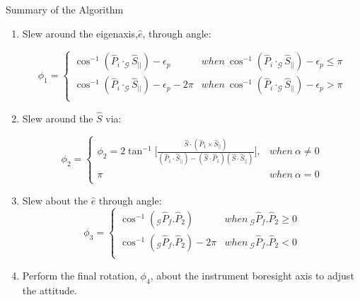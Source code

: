 \documentclass{beamer}
\begin{document}
\begin{frame}{Summary of the Algorithm}
\begin{block}{}
\begin{enumerate}
\item Slew around the eigenaxis,$\hat{e}$, through angle:

 \begin{equation}\label{phi1}
 \phi_1=\left\{
                \begin{array}{ll}
                 \cos^{-1}(\hat{P}_i\cdot_\mathcal{G}\hat{S}_{||})-\epsilon_p& when\  \cos^{-1}(\hat{P}_i\cdot_\mathcal{G}\hat{S}_{||})-\epsilon_p\leq \pi\\
                 \cos^{-1}(\hat{P}_i\cdot_\mathcal{G}\hat{S}_{||})-\epsilon_p-2\pi& when\ \cos^{-1}(\hat{P}_i\cdot_\mathcal{G}\hat{S}_{||})-\epsilon_p>\pi\\
                \end{array}
              \right.
 \end{equation}
\item Slew around the $\hat{S}$ via:

 \begin{equation}\label{phi2}
 \phi_2=\left\{
                \begin{array}{ll}
                \phi_2=2\tan^{-1}\Big[ \frac{\hat{S}\cdot (\hat{P}_1\times\hat{S}_{||})}{(\hat{P}_1\cdot\hat{S}_{||})-(\hat{S}\cdot\hat{P}_1)(\hat{S}\cdot\hat{S}_{||})}\Big],& when\  \alpha\neq 0\\
                 \pi& when\ \alpha=0\\
                \end{array}
              \right.
 \end{equation}
 \item Slew about the $\hat{e}$ through angle:
 \begin{equation}\label{phi3}
 \phi_3=\left\{
                \begin{array}{ll}
                  \cos^{-1}(_\mathcal{G}\hat{P}_f.\hat{P}_2)& when\  _\mathcal{G}\hat{P}_f.\hat{P}_2\geq 0\\
                 \cos^{-1}(_\mathcal{G}\hat{P}_f.\hat{P}_2)-2\pi& when\ _\mathcal{G}\hat{P}_f.\hat{P}_2<0\\
                \end{array}
              \right.
 \end{equation}

\item Perform the final rotation, $\phi_4$, about the instrument boresight axis to adjust the attitude. 
\end{enumerate}
\end{block}
\end{frame}
\end{document}
